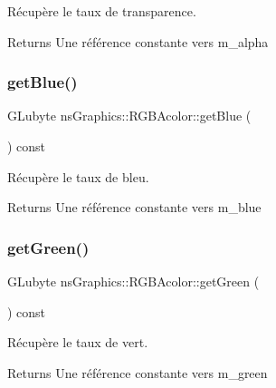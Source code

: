 Récupère le taux de transparence. 

\begin{DoxyReturn}{Returns}
Une référence constante vers m\+\_\+alpha 
\end{DoxyReturn}
\mbox{\label{classns_graphics_1_1_r_g_b_acolor_a9ac0893426cce20a177d6ea7af1d7129}} 
\subsubsection{\texorpdfstring{get\+Blue()}{getBlue()}}
{\footnotesize\ttfamily G\+Lubyte ns\+Graphics\+::\+R\+G\+B\+Acolor\+::get\+Blue (\begin{DoxyParamCaption}{ }\end{DoxyParamCaption}) const}



Récupère le taux de bleu. 

\begin{DoxyReturn}{Returns}
Une référence constante vers m\+\_\+blue 
\end{DoxyReturn}
\mbox{\label{classns_graphics_1_1_r_g_b_acolor_a5f2dc1550c34149fc5cbc1629b54d7e4}} 
\subsubsection{\texorpdfstring{get\+Green()}{getGreen()}}
{\footnotesize\ttfamily G\+Lubyte ns\+Graphics\+::\+R\+G\+B\+Acolor\+::get\+Green (\begin{DoxyParamCaption}{ }\end{DoxyParamCaption}) const}



Récupère le taux de vert. 

\begin{DoxyReturn}{Returns}
Une référence constante vers m\+\_\+green 
\end{DoxyReturn}
\mbox{\label{classns_graphics_1_1_r_g_b_acolor_a55e40085f904b696a0bc63aed6258b79}} 
